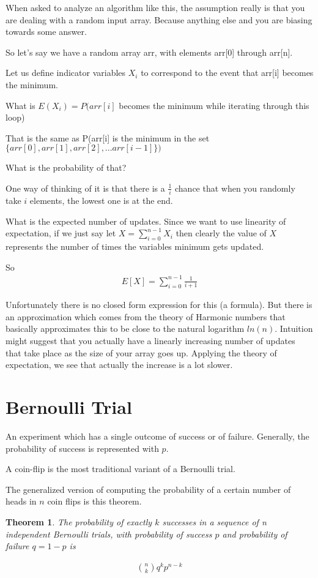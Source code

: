 \documentclass[12pt]{article}
\newtheorem{theorem}{Theorem}
\begin{document}
When asked to analyze an algorithm like this, the assumption really is that you are dealing with a random input array. Because anything else and you are biasing towards some answer.

So let's say we have a random array arr, with elements arr[0] through arr[n].

Let us define indicator variables $X_i$ to correspond to the event that arr[i] becomes the minimum. 

What is $E(X_i) = P(arr[i]$ becomes the minimum while iterating through this loop)

That is the same as P(arr[i] is the minimum in the set 
$\{arr[0], arr[1], arr[2],...arr[i-1]\})$
 
What is the probability of that? 

One way of thinking of it is that there is a $\frac{1}{i}$ chance that when you randomly take $i$ elements, the lowest one is at the end. 

What is the expected number of updates. Since we want to use linearity of expectation, if we 
just say let $\displaystyle X = \sum_{i=0}^{n-1}X_i$ then clearly the value of $X$ represents the number of times the variables minimum gets updated.

So
\begin{align*}
E[X] = \sum_{i=0}^{n-1} \frac{1}{i+1} 
\end{align*} 

Unfortunately there is no closed form expression for this (a formula). But there is an approximation which comes from the theory of Harmonic numbers that basically approximates this to be close to the natural logarithm $ln(n)$. Intuition might suggest that you actually have a linearly increasing number of updates that take place as the size of your array goes up. Applying the theory of expectation, we see that actually the increase is a lot slower.

\section*{Bernoulli Trial}
An experiment which has a single outcome of success or of failure. Generally, the probability of success is represented with $p$. 

A coin-flip is the most traditional variant of a Bernoulli trial.

The generalized version of computing the probability of a certain number of heads in $n$ coin flips is this theorem.

\begin{theorem}
The probability of exactly $k$ successes in a sequence of n independent Bernoulli trials, with probability of success $p$ and probability of failure $q = 1-p$ is

\begin{align*}
\binom{n}{k}q^kp^{n-k}
\end{align*}

\end{theorem}
\end{document}
